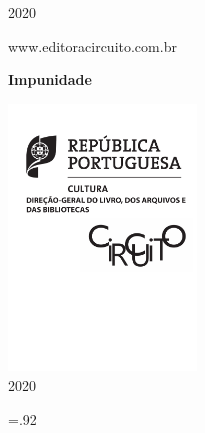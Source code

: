 {\begin{Parskip}
\vspace*{\fill}

2020

www.editoracircuito.com.br
\end{Parskip}

\pagebreak
\begin{flushright}
 
\vspace*{5cm}

\huge{\textbf{Impunidade}} \hspace*{1.25cm}

\LARGE{} \hspace*{1.6cm}


\vfill
\hfill\includegraphics[width=5cm]{logos.pdf}\\ \normalsize{2020}
\par\end{flushright}\clearpage
\begingroup \footnotesize \parindent0pt \parskip 5pt \thispagestyle{empty} \vspace*{.25\textheight}\mbox{} \vfill
\baselineskip=.92\baselineskip
{}
\thispagestyle{empty} \endgroup
\ifdefvoid{\sobreautor}{}{\pagebreak\ifodd\thepage\paginabranca\fi}

}
